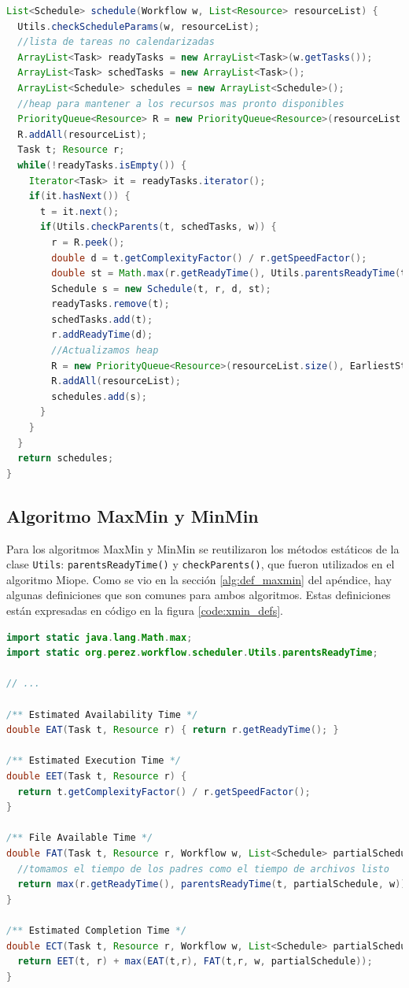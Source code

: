 \begin{lstlisting}[language=java,label={code:myopic},caption={Código del algoritmo Miope},float]
List<Schedule> schedule(Workflow w, List<Resource> resourceList) {
  Utils.checkScheduleParams(w, resourceList);
  //lista de tareas no calendarizadas
  ArrayList<Task> readyTasks = new ArrayList<Task>(w.getTasks());
  ArrayList<Task> schedTasks = new ArrayList<Task>();
  ArrayList<Schedule> schedules = new ArrayList<Schedule>();
  //heap para mantener a los recursos mas pronto disponibles
  PriorityQueue<Resource> R = new PriorityQueue<Resource>(resourceList.size(), EarliestStartTimeComparator.getComp());
  R.addAll(resourceList);
  Task t; Resource r;
  while(!readyTasks.isEmpty()) {
    Iterator<Task> it = readyTasks.iterator();
    if(it.hasNext()) {
      t = it.next();
      if(Utils.checkParents(t, schedTasks, w)) {
        r = R.peek();
        double d = t.getComplexityFactor() / r.getSpeedFactor();
        double st = Math.max(r.getReadyTime(), Utils.parentsReadyTime(t, schedules, w));
        Schedule s = new Schedule(t, r, d, st);
        readyTasks.remove(t);
        schedTasks.add(t);
        r.addReadyTime(d);
        //Actualizamos heap
        R = new PriorityQueue<Resource>(resourceList.size(), EarliestStartTimeComparator.getComp());
        R.addAll(resourceList);
        schedules.add(s);
      }
    }
  }
  return schedules;
}
\end{lstlisting}

\subsection{Algoritmo MaxMin y MinMin}
Para los algoritmos MaxMin y MinMin se reutilizaron los métodos estáticos de la clase \texttt{Utils}: \texttt{parentsReadyTime()} y \texttt{checkParents()}, que fueron utilizados en el algoritmo Miope. Como se vio en la sección \ref{alg:def_maxmin} del apéndice, hay algunas definiciones que son comunes para ambos algoritmos. Estas definiciones están expresadas en código en la figura \ref{code:xmin_defs}.

\begin{lstlisting}[language=java,label={code:xmin_defs},caption={Código de las definiciones comunes para MaxMin y MinMin.},float]
import static java.lang.Math.max; 
import static org.perez.workflow.scheduler.Utils.parentsReadyTime;

// ...

/** Estimated Availability Time */
double EAT(Task t, Resource r) { return r.getReadyTime(); }

/** Estimated Execution Time */
double EET(Task t, Resource r) { 
  return t.getComplexityFactor() / r.getSpeedFactor(); 
}

/** File Available Time */
double FAT(Task t, Resource r, Workflow w, List<Schedule> partialSchedule) {
  //tomamos el tiempo de los padres como el tiempo de archivos listo
  return max(r.getReadyTime(), parentsReadyTime(t, partialSchedule, w));
}

/** Estimated Completion Time */
double ECT(Task t, Resource r, Workflow w, List<Schedule> partialSchedule) {
  return EET(t, r) + max(EAT(t,r), FAT(t,r, w, partialSchedule));
}
\end{lstlisting}

